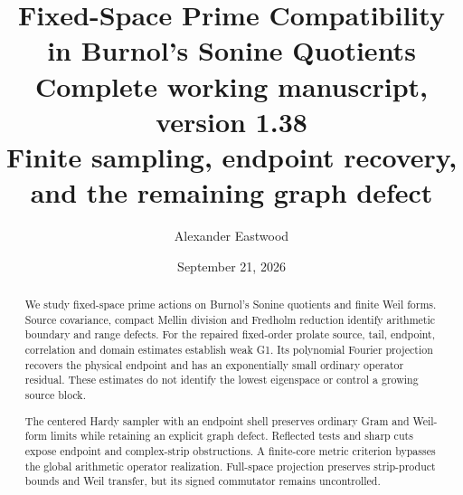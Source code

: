 \documentclass[11pt]{article}
\title{\textbf{Fixed-Space Prime Compatibility in Burnol's Sonine Quotients}\\[5pt]
\large Complete working manuscript, version 1.38\\
\normalsize Finite sampling, endpoint recovery, and the remaining graph defect}
\author{Alexander Eastwood}
\date{September 21, 2026}
\theoremstyle{remark}
\begin{document}
\maketitle
\begin{abstract}
We study fixed-space prime actions on Burnol's Sonine quotients and
finite Weil forms. Source covariance, compact Mellin division and
Fredholm reduction identify arithmetic boundary and range defects.
For the repaired fixed-order prolate source, tail, endpoint, correlation
and domain estimates establish weak G1. Its polynomial Fourier
projection recovers the physical endpoint and has an exponentially
small ordinary operator residual. These estimates do not identify
the lowest eigenspace or control a growing source block.

The centered Hardy sampler with an endpoint shell preserves ordinary
Gram and Weil-form limits while retaining an explicit graph defect.
Reflected tests and sharp cuts expose endpoint and complex-strip
obstructions. A finite-core metric criterion bypasses the global
arithmetic operator realization. Full-space projection preserves
strip-product bounds and Weil transfer, but its signed commutator
remains uncontrolled.


\end{abstract}
\end{document}
